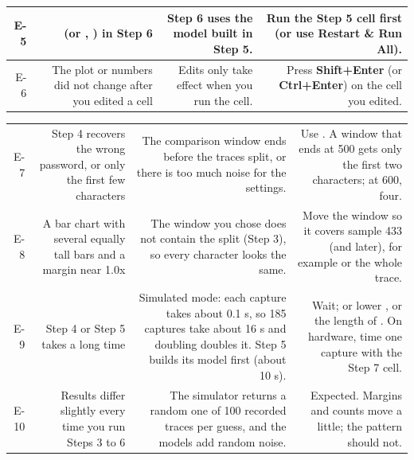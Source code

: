 \documentclass[11pt,letterpaper]{article}
\begin{document}
{\begin{longtable}{|R{0.0652}|R{0.3116}|R{0.2536}|R{0.3696}|}
E-5 &  (or , ) in Step 6 & Step 6 uses the model built in Step 5. & Run the Step 5 cell first (or use \textbf{Restart \& Run All}). \\ \hline
E-6 & The plot or numbers did not change after you edited a cell & Edits only take effect when you run the cell. & Press \textbf{Shift+Enter} (or \textbf{Ctrl+Enter}) on the cell you edited. \\ \hline
\end{longtable}}

\vspace{4pt}

\vspace{4pt}


{\small{}
\begin{longtable}{|R{0.0652}|R{0.3116}|R{0.2536}|R{0.3696}|}
\hline
{}\hdrcell{\#} &  &  &  \\ \hline
\endhead
E-7 & Step 4 recovers the wrong password, or only the first few characters & The comparison window ends before the traces split, or there is too much noise for the settings. & Use . A window that ends at 500 gets only the first two characters; at 600, four. \\ \hline
E-8 & A bar chart with several equally tall bars and a margin near 1.0x & The window you chose does not contain the split (Step 3), so every character looks the same. & Move the window so it covers sample 433 (and later), for example  or the whole trace. \\ \hline
E-9 & Step 4 or Step 5 takes a long time & Simulated mode: each capture takes about 0.1 s, so 185 captures take about 16 s and doubling  doubles it. Step 5 builds its model first (about 10 s). & Wait; or lower ,  or the length of . On hardware, time one capture with the Step 7 cell. \\ \hline
E-10 & Results differ slightly every time you run Steps 3 to 6 & The simulator returns a random one of 100 recorded traces per guess, and the models add random noise. & Expected. Margins and counts move a little; the pattern should not. \\ \hline
\end{longtable}}
\end{document}
